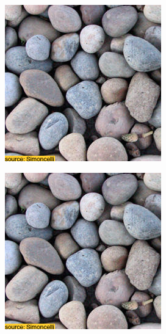 \begin{figure}[]
\begin{subfigure}{\textwidth}
        \begin{subfigure}{0.24\textwidth}
            \centering
            \includegraphics[width=\textwidth]{images/04-experiment01/pebbles/target.jpg}
        \end{subfigure}
        \hfill
        \begin{subfigure}{0.24\textwidth}
            \centering
            \includegraphics[width=\textwidth]{images/04-experiment01/pebbles/pebbles_bg.jpg}

\end{subfigure}
\end{subfigure}
\end{figure}
